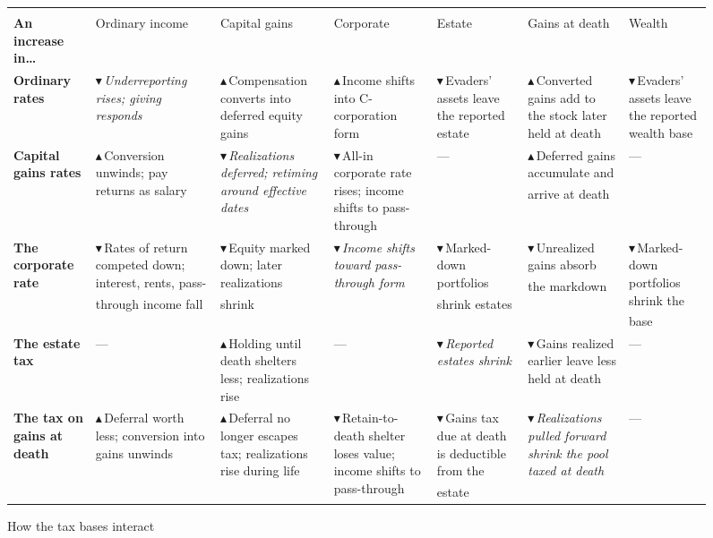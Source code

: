\documentclass[10pt,twocolumn]{article}
\newcommand{\own}[1]{\cellcolor{diagtint}\itshape #1}
\newcommand{\mech}{\textsuperscript{\,\textdegree}}
\newcommand{\up}{\textcolor{yaleblue}{\large$\blacktriangle$}\,}
\newcommand{\dn}{\textcolor{dnred}{\large$\blacktriangledown$}\,}
\newlength{\lblw}
\newlength{\colw}
\begin{document}
\begin{figure}[p]
\caption{How the tax bases interact}
\label{fig:interactions}
\vspace{0.4em}
\footnotesize
\renewcommand{\arraystretch}{2.2}
\setlength{\tabcolsep}{4pt}
\setlength{\lblw}{1.9cm}
\setlength{\colw}{\dimexpr(\textwidth-\lblw-12\tabcolsep)/6\relax}
\begin{tabular}{@{}>{\raggedright\arraybackslash\bfseries}p{\lblw}*{6}{>{\raggedright\arraybackslash}p{\colw}}@{}}
\toprule
 & \multicolumn{6}{c}{\textbf{\ldots moves this base}} \\
\cmidrule(l){2-7}
\textbf{An increase in\ldots} & Ordinary income & Capital gains & Corporate & Estate & Gains at death & Wealth \\
\midrule
Ordinary rates &
\own{\dn Underreporting rises; giving responds} &
\up Compensation converts into deferred equity gains &
\up Income shifts into C-corporation form &
\dn Evaders' assets leave the reported estate &
\up Converted gains add to the stock later held at death &
\dn Evaders' assets leave the reported wealth base \\

Capital gains rates &
\up Conversion unwinds; pay returns as salary &
\own{\dn Realizations deferred; retiming around effective dates} &
\dn All-in corporate rate rises; income shifts to pass-through &
--- &
\up Deferred gains accumulate and arrive at death\mech &
--- \\

The corporate rate &
\dn Rates of return competed down; interest, rents, pass-through income fall\mech &
\dn Equity marked down; later realizations shrink\mech &
\own{\dn Income shifts toward pass-through form} &
\dn Marked-down portfolios shrink estates\mech &
\dn Unrealized gains absorb the markdown\mech &
\dn Marked-down portfolios shrink the base\mech \\

The estate tax &
--- &
\up Holding until death shelters less; realizations rise &
--- &
\own{\dn Reported estates shrink} &
\dn Gains realized earlier leave less held at death &
--- \\

The tax on gains at death &
\up Deferral worth less; conversion into gains unwinds &
\up Deferral no longer escapes tax; realizations rise during life &
\dn Retain-to-death shelter loses value; income shifts to pass-through &
\dn Gains tax due at death is deductible from the estate\mech &
\own{\dn Realizations pulled forward shrink the pool taxed at death} &
--- \\


\end{tabular}
\end{figure}
\end{document}
